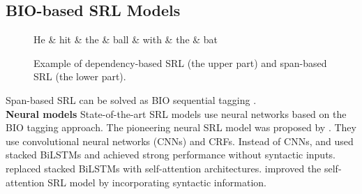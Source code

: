 \documentclass[11pt,a4paper]{article}
\begin{document}
\subsection{BIO-based SRL Models}
\begin{figure}[t]
\centering
\begin{dependency}[text only label, label style={above}, edge style={green!60!black,very thick}]

\begin{deptext}[column sep=.2cm]
He \& hit \& the \& ball \& with \& the \& bat \\
\end{deptext}




\end{dependency}
\caption{\label{fig:dep:exam} Example of dependency-based SRL (the upper part) and span-based SRL (the lower part).}
\end{figure}

Span-based SRL can be solved as BIO sequential tagging \cite{hacioglu:04,pradhan:05,marquez:05}.\\

\noindent
{\bf Neural models} \hspace{0.2cm} State-of-the-art SRL models use neural networks based on the BIO tagging approach.
The pioneering neural SRL model was proposed by .
They use convolutional neural networks (CNNs) and CRFs.
Instead of CNNs,  and  used stacked BiLSTMs and achieved strong performance without syntactic inputs.
 replaced stacked BiLSTMs with self-attention architectures.
 improved the self-attention SRL model by incorporating syntactic information.
\end{document}
